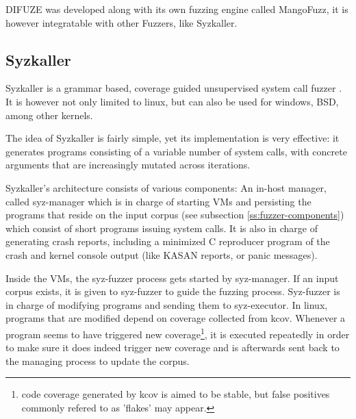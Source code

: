 DIFUZE was developed along with its own fuzzing engine called MangoFuzz, it is however integratable with other Fuzzers, like Syzkaller.



\subsection{Syzkaller}\label{ss:syzkaller}

Syzkaller is a grammar based, coverage guided unsupervised
system call fuzzer \cite{GoogleSyzkaller2021}. It is however not only
limited to linux, but can also be used for windows, BSD, among other
kernels.

The idea of Syzkaller is fairly simple, yet its implementation is very effective: it generates
programs consisting of a variable number of system calls, with
concrete arguments that are increasingly mutated across iterations.


Syzkaller's architecture consists of various components: An in-host manager, called
syz-manager which is in charge of starting VMs and persisting the programs that
reside on the input corpus (see subsection \ref{ss:fuzzer-components}) which consist of short programs issuing
system calls. It is also in charge of generating crash reports, including a minimized C reproducer program of the crash and kernel console output (like KASAN reports, or panic
messages).

Inside the VMs, the syz-fuzzer process gets started by syz-manager. If an input
corpus exists, it is given to syz-fuzzer to guide the fuzzing process. Syz-fuzzer is
in charge of modifying programs and sending them to syz-executor. In linux, programs that
are modified depend on coverage collected from kcov. Whenever a program seems to have triggered new coverage\footnote{code coverage generated by kcov is aimed to be stable, but false positives commonly refered to as 'flakes' may appear.},
it is executed repeatedly in order to make sure it does indeed trigger new coverage and is
afterwards sent back to the managing process to update the corpus.

